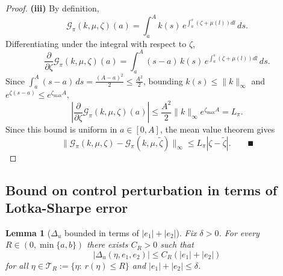 \documentclass[journal,twoside,web]{ieeecolor}
\newtheorem{lemma}{Lemma}
\begin{document}
\begin{proof}
\textbf{(iii)} By definition,
\begin{equation}
\mathcal{G}_\pi(k,\mu,\zeta)(a) = \int_a^A k(s)\,e^{\int_a^s(\zeta+\mu(l))dl}\,ds.
\end{equation}
Differentiating under the integral with respect to $\zeta$,
\begin{equation}
\frac{\partial}{\partial\zeta}\mathcal{G}_\pi(k,\mu,\zeta)(a) = \int_a^A (s-a)\,k(s)\,e^{\int_a^s(\zeta+\mu(l))dl}\,ds.
\end{equation}
Since $\int_a^A(s-a)\,ds = \frac{(A-a)^2}{2} \leq \frac{A^2}{2}$, bounding $k(s) \leq \|k\|_\infty$ and $e^{\zeta(s-a)} \leq e^{\zeta_{\max}A}$,
\begin{equation}
\left|\frac{\partial}{\partial\zeta}\mathcal{G}_\pi(k,\mu,\zeta)(a)\right| \leq \frac{A^2}{2}\|k\|_\infty e^{\zeta_{\max}A} = L_\pi.
\end{equation}
Since this bound is uniform in $a \in [0,A]$, the mean value theorem gives
\begin{equation}
\|\mathcal{G}_\pi(k,\mu,\zeta) - \mathcal{G}_\pi(k,\mu,\tilde\zeta)\|_\infty \leq L_\pi|\zeta-\tilde\zeta|. \qquad \QED
\end{equation}
\end{proof}

\subsection{Bound on control perturbation in terms of Lotka-Sharpe error}
\label{app-bound}

\begin{lemma}[$\Delta_u$ bounded in terms of $|e_1|+|e_2|$]
\label{lem-Delta_u}
Fix $\delta>0$. For every $R\in(0,\min\{a,b\})$ there exists $C_{R}>0$ such that
\begin{equation}
|\Delta_u(\eta,e_1,e_2)|\le C_{R}(|e_1|+|e_2|)
\end{equation}
for all $\eta\in\mathcal T_{R}:=\{\eta:\ r(\eta)\le R\}$ and $ |e_1|+|e_2|\le\delta$.
\end{lemma}
\end{document}
